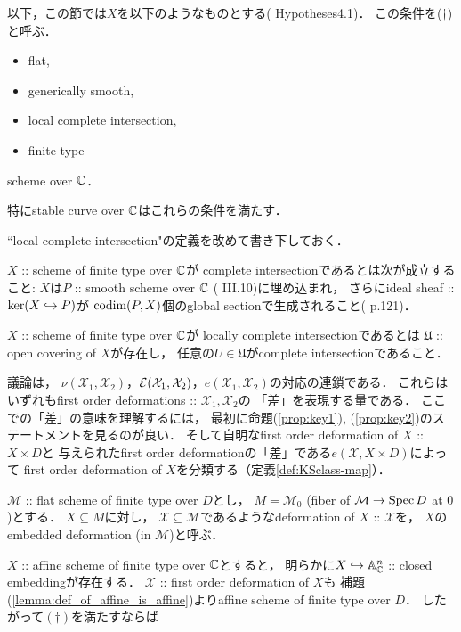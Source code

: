 \documentclass[a4paper]{jsarticle}
\newcommand{\cvU}{\mathfrak{U}}
\newcommand{\defX}{\mathcal{X}}
\newcommand{\defM}{\mathcal{M}}
\begin{document}
    以下，この節では$X$を以下のようなものとする(\cite{DefLCI} Hypotheses4.1)．
    この条件を($\dagger$)と呼ぶ．
    \begin{screen}
    \begin{itemize}
        \item flat,
        \item generically smooth,
        \item local complete intersection,
        \item finite type
    \end{itemize}
        scheme over $\mathbb{C}$．
    \end{screen}
    特にstable curve over $\mathbb{C}$はこれらの条件を満たす．

    ``local complete intersection"の定義を改めて書き下しておく．
    \begin{Def}
        $X$ :: scheme of finite type over $\mathbb{C}$が
        complete intersectionであるとは次が成立すること:
        $X$は$P$ :: smooth scheme over $\mathbb{C}$ (\cite{HarAG} III.10)に埋め込まれ，
        さらにideal sheaf :: $\ker(X \hookrightarrow P)$が
        $\operatorname{codim}(P, X)$個のglobal sectionで生成されること(\cite{HarAG} p.121)．

        $X$ :: scheme of finite type over $\mathbb{C}$が
        locally complete intersectionであるとは
        $\cvU$ :: open covering of $X$が存在し，
        任意の$U \in \cvU$がcomplete intersectionであること．
    \end{Def}
    
    議論は，
    $\nu(\defX_1, \defX_2)$，$\shE(\defX_1, \defX_2)$，$e(\defX_1, \defX_2)$の対応の連鎖である．
    これらはいずれもfirst order deformations :: $\defX_1, \defX_2$の
    「差」を表現する量である．
    ここでの「差」の意味を理解するには，
    最初に命題(\ref{prop:key1}), (\ref{prop:key2})のステートメントを見るのが良い．
    そして自明なfirst order deformation of $X$ :: $X \times D$と
    与えられたfirst order deformationの「差」である$e(\defX, X \times D)$によって
    first order deformation of $X$を分類する（定義\ref{def:KSclass-map}）．

    \begin{Def}
        $\defM$ :: flat scheme of finite type over $D$とし，
        $M=\defM_{0}$ (fiber of $\defM \to \Spec D$ at $0$)とする．
        $X \subseteq M$に対し，
        $\defX \subseteq \defM$であるようなdeformation of $X$ :: $\defX$を，
        $X$のembedded deformation (in $\defM$)と呼ぶ．
    \end{Def}
    $X$ :: affine scheme of finite type over $\mathbb{C}$とすると，
    明らかに$X \hookrightarrow \mathbb{A}^n_{\mathbb{C}}$ :: closed embeddingが存在する．
    $\defX$ :: first order deformation of $X$も
    補題(\ref{lemma:def_of_affine_is_affine})よりaffine scheme of finite type over $D$．
    したがって$(\dagger)$を満たすならば
\end{document}
